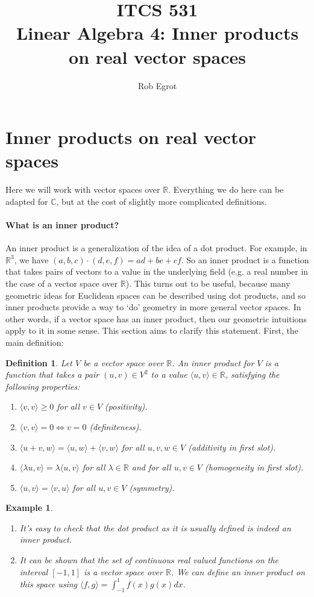 \documentclass{article}
\title{ITCS 531 \\Linear Algebra 4: Inner products on real vector spaces}
\author{Rob Egrot}
\date{}
\theoremstyle{plain}
\newtheorem{definition}[theorem]{Definition}{\bfseries}{\upshape}
\newtheorem{example}[theorem]{Example}{\bfseries}{\upshape}
\newcommand{\bC}{\mathbb{C}}
\newcommand{\bR}{\mathbb{R}}
\begin{document}
\maketitle
\section{Inner products on real vector spaces}
 Here we will work with vector spaces over $\bR$. Everything we do here can be adapted for $\bC$, but at the cost of slightly more complicated definitions. 
\paragraph{What is an inner product?}
An inner product is a generalization of the idea of a dot product. For example, in $\bR^3$, we have $(a,b,c)\cdot(d,e,f)=ad+be+cf$. So an inner product is a function that takes pairs of vectors to a value in the underlying field (e.g. a real number in the case of a vector space over $\bR$). This turns out to be useful, because many geometric ideas for Euclidean spaces can be described using dot products, and so inner products provide a way to `do' geometry in more general vector spaces. In other words, if a vector space has an inner product, then our geometric intuitions apply to it in some sense. This section aims to clarify this statement. First, the main definition:    

\begin{definition}
Let $V$ be a vector space over $\bR$. An \emph{inner product} for $V$ is a function that takes a pair $(u,v)\in V^2$ to a value $\langle u,v\rangle  \in\bR$, satisfying the following properties:
\begin{enumerate}
\item $\langle v,v\rangle  \geq 0$ for all $v\in V$ (positivity).
\item $\langle v,v\rangle  =0\iff v = 0$ (definiteness).
\item $\langle u+v,w\rangle  =\langle u,w\rangle  +\langle v,w\rangle  $ for all $u,v,w\in V$ (additivity in first slot).
\item $\langle \lambda u,v\rangle   = \lambda\langle u,v\rangle  $ for all $\lambda\in \bR$ and for all $u,v\in V$ (homogeneity in first slot).  
\item $\langle u,v\rangle   = \langle v,u\rangle  $ for all $u,v\in V$ (symmetry).
\end{enumerate}
\end{definition}

\begin{example}\mbox{}
\begin{enumerate}
\item It's easy to check that the dot product as it is usually defined is indeed an inner product.
\item It can be shown that the set of continuous real valued functions on the interval $[-1,1]$ is a vector space over $\bR$. We can define an inner product on this space using $\langle f,g\rangle   = \int_{-1}^1 f(x)g(x)dx$.
\end{enumerate}
\end{example}
\end{document}
